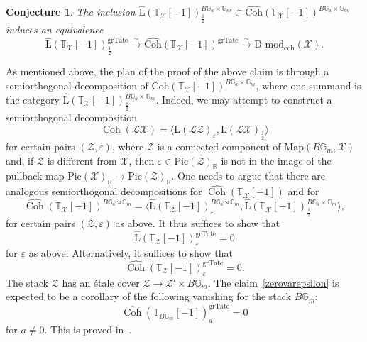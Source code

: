 \documentclass [11pt,oneside,a4paper,mathscr]{amsart}
\newtheorem{conj}[thm]{Conjecture}
\theoremstyle{definition}
\newcommand{\X}{\mathcal{X}}
\newcommand{\bgm}{B\mathbb{G}_m}
\newcommand{\Coh}{\operatorname{Coh}}
\begin{document}
\begin{conj}
    The inclusion $\hat{\mathrm{L}}(\mathbb{T}_\X[-1])^{B\mathbb{G}_a\times\mathbb{G}_m}_{\frac{1}{2}}\subset \hat{\mathrm{Coh}}(\mathbb{T}_\X[-1])^{B\mathbb{G}_a\times\mathbb{G}_m}$ induces an equivalence 
    \[\hat{\mathrm{L}}(\mathbb{T}_\X[-1])^{\mathrm{grTate}}_{\frac{1}{2}}
    \xrightarrow{\sim} \hat{\mathrm{Coh}}(\mathbb{T}_\X[-1])^{\mathrm{grTate}}\xrightarrow{\sim} 
    \mathrm{D}\text{-}\mathrm{mod}_{\mathrm{coh}}(\X).\]
\end{conj}


As mentioned above, the plan of the proof of the above claim is through a semiorthogonal decomposition of $\hat{\mathrm{Coh}}(\mathbb{T}_\X[-1])^{B\mathbb{G}_a\times\mathbb{G}_m}$, where one summand is the category $\hat{\mathrm{L}}(\mathbb{T}_\X[-1])^{B\mathbb{G}_a\times\mathbb{G}_m}_{\frac{1}{2}}$. 
Indeed, we may attempt to construct a semiorthogonal decomposition \[\Coh(\mathcal{L}\X)=\big\langle \mathrm{L}(\mathcal{L}\mathcal{Z})_\varepsilon, \mathrm{L}(\mathcal{L}\X)_{\frac{1}{2}}\big\rangle\] for certain pairs $(\mathcal{Z}, \varepsilon)$,  where $\mathcal{Z}$ is a connected component of $\text{Map}(\bgm, \mathcal{X})$ and, if $\mathcal{Z}$ is different from $\mathcal{X}$, then $\varepsilon\in \text{Pic}(\mathcal{Z})_\mathbb{R}$ is not in the image of the pullback map $\text{Pic}(\mathcal{X})_\mathbb{R}\to \text{Pic}(\mathcal{Z})_\mathbb{R}$. 
One needs to argue that there are analogous semiorthogonal decompositions for $\hat{\Coh}(\mathbb{T}_\X[-1])$ and for \[\hat{\Coh}(\mathbb{T}_\X[-1])^{B\mathbb{G}_a\rtimes\mathbb{G}_m}=\big\langle \hat{\text{L}}(\mathbb{T}_\mathcal{Z}[-1])_\varepsilon^{B\mathbb{G}_a\rtimes\mathbb{G}_m}, \hat{\mathrm{L}}(\mathbb{T}_\X[-1])^{B\mathbb{G}_a\times\mathbb{G}_m}_{\frac{1}{2}}\big\rangle ,\] for certain pairs $(\mathcal{Z},\varepsilon)$ as above. 
It thus suffices to show that 
\[\hat{\text{L}}(\mathbb{T}_\mathcal{Z}[-1])_\varepsilon^{\text{grTate}}=0\] for $\varepsilon$ as above. Alternatively, it suffices to show that 
\begin{equation}\label{zerovarepsilon}
\hat{\Coh}(\mathbb{T}_\mathcal{Z}[-1])_\varepsilon^{\text{grTate}}=0.
\end{equation}
The stack $\mathcal{Z}$ has an étale cover $\mathcal{Z}\to\mathcal{Z}'\times \bgm$. The claim~\eqref{zerovarepsilon} is expected to be a corollary of the following vanishing for the stack $\bgm$:
\[\hat{\Coh}(\mathbb{T}_{\bgm}[-1])^{\text{grTate}}_a=0\] for $a\neq 0$. 
This is proved in~\cite[Subsection 3.5.6]{HChen}. 
\end{document}
